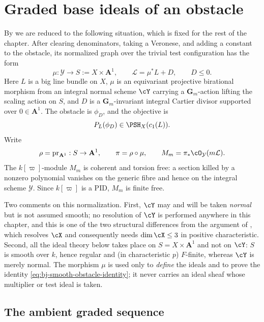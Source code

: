 \section{Graded base ideals of an obstacle}
\label{sec:ch40-base-ideals}

By  we are reduced to the following
situation, which is fixed for the rest of the chapter.  After clearing
denominators, taking a Veronese, and adding a constant to the obstacle, its
normalized graph over the trivial test configuration has
the form
\[
 \mu:\mathcal Y\longrightarrow
 S:=X\times\mathbf A^1,\qquad
 \mathcal L=\mu^*L+D,\qquad D\le0.
\tag{40.2}\label{eq:bj-smooth-graph}
\]
Here $L$ is a big line bundle on $X$, $\mu$ is an equivariant
projective birational morphism from an integral normal scheme $\cY$
carrying a $\mathbf G_m$-action lifting the scaling action on $S$, and
$D$ is a $\mathbf G_m$-invariant integral Cartier divisor supported over
$0\in\mathbf A^1$.  The obstacle is $\phi_D$, and the objective is
\[
 P_L(\phi_D)\in\PSH_X(c_1(L)).
\]
Write
\[
 \rho=\operatorname{pr}_{\mathbf A^1}:S\to\mathbf A^1,\qquad
 \pi=\rho\circ\mu,\qquad
 M_m=\pi_*\cO_{\mathcal Y}(m\mathcal L).
\]
The $k[\varpi]$-module $M_m$ is coherent and torsion free: a section killed
by a nonzero polynomial vanishes on the generic fibre and hence on the
integral scheme $\mathcal Y$.  Since $k[\varpi]$ is a PID, $M_m$ is finite
free.

Two comments on this normalization.  First, $\cY$ may and will be taken
\emph{normal} but is not assumed smooth; no resolution of $\cY$ is
performed anywhere in this chapter, and this is one of the two structural
differences from the argument of , which resolves
$\cX$ and consequently needs $\dim\cX\le3$ in positive characteristic.
Second, all the ideal theory below takes place on $S=X\times\mathbf A^1$
and not on $\cY$: $S$ is smooth over $k$, hence regular and (in
characteristic $p$) $F$-finite, whereas $\cY$ is merely normal.  The
morphism $\mu$ is used only to \emph{define} the ideals and to prove the
identity \eqref{eq:bj-smooth-obstacle-identity}; it never carries an ideal
sheaf whose multiplier or test ideal is taken.

\subsection{The ambient graded sequence}
\label{sec:ch40-ambient-ideal}

